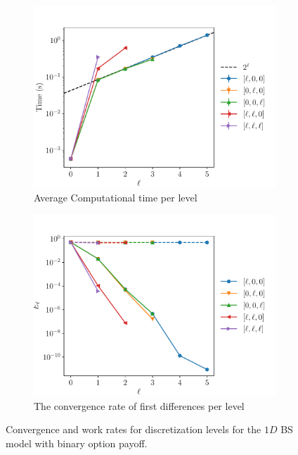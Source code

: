 \documentclass[11pt]{article}
\begin{document}
\begin{figure}[!h]
	\centering
	\begin{subfigure}{.5\textwidth}
		\centering
		\includegraphics[width=0.95\linewidth]{./figures/binary_4_steps/level_work.pdf}
		\caption{Average Computational time per level}
		\label{fig:misc_binary_4_steps_sub3}
	\end{subfigure}%
	\begin{subfigure}{.5\textwidth}
		\centering
		\includegraphics[width=0.95\linewidth]{./figures/binary_4_steps/levels_error_rate.pdf}
		\caption{ The convergence rate of first differences per level}
		\label{fig:misc_binary_4_steps_sub4}
	\end{subfigure}%
	\caption{Convergence and work rates for discretization levels for the $1D$ BS model with binary option payoff.}
	\label{fig:misc_binary_4_steps_2}
\end{figure}
\end{document}

